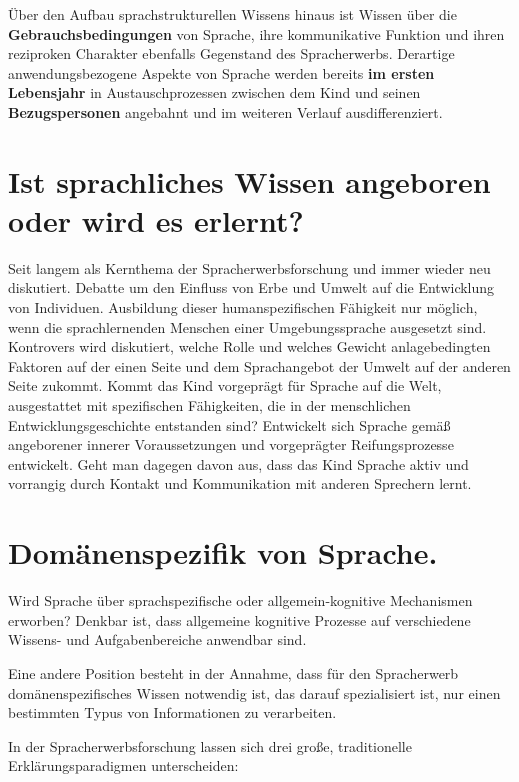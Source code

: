 \documentclass[
  letterpaper,
]{scrbook}
\begin{document}
Über den Aufbau sprachstrukturellen Wissens hinaus ist Wissen über die
\textbf{Gebrauchsbedingungen} von Sprache, ihre kommunikative Funktion
und ihren reziproken Charakter ebenfalls Gegenstand des Spracherwerbs.
Derartige anwendungsbezogene Aspekte von Sprache werden bereits
\textbf{im ersten Lebensjahr} in Austauschprozessen zwischen dem Kind
und seinen \textbf{Bezugspersonen} angebahnt und im weiteren Verlauf
ausdifferenziert.

\hypertarget{ist-sprachliches-wissen-angeboren-oder-wird-es-erlernt}{%
\section{Ist sprachliches Wissen angeboren oder wird es
erlernt?}\label{ist-sprachliches-wissen-angeboren-oder-wird-es-erlernt}}

Seit langem als Kernthema der Spracherwerbsforschung und immer wieder
neu diskutiert. Debatte um den Einfluss von Erbe und Umwelt auf die
Entwicklung von Individuen. Ausbildung dieser humanspezifischen
Fähigkeit nur möglich, wenn die sprachlernenden Menschen einer
Umgebungssprache ausgesetzt sind. Kontrovers wird diskutiert, welche
Rolle und welches Gewicht anlagebedingten Faktoren auf der einen Seite
und dem Sprachangebot der Umwelt auf der anderen Seite zukommt. Kommt
das Kind vorgeprägt für Sprache auf die Welt, ausgestattet mit
spezifischen Fähigkeiten, die in der menschlichen Entwicklungsgeschichte
entstanden sind? Entwickelt sich Sprache gemäß angeborener innerer
Voraussetzungen und vorgeprägter Reifungsprozesse entwickelt. Geht man
dagegen davon aus, dass das Kind Sprache aktiv und vorrangig durch
Kontakt und Kommunikation mit anderen Sprechern lernt.  

\hypertarget{domuxe4nenspezifik-von-sprache.}{%
\section{Domänenspezifik von
Sprache.}\label{domuxe4nenspezifik-von-sprache.}}

Wird Sprache über sprachspezifische oder allgemein-kognitive Mechanismen
erworben? Denkbar ist, dass allgemeine kognitive Prozesse auf
verschiedene Wissens- und Aufgabenbereiche anwendbar sind.

Eine andere Position besteht in der Annahme, dass für den Spracherwerb
domänenspezifisches Wissen notwendig ist, das darauf spezialisiert ist,
nur einen bestimmten Typus von Informationen zu verarbeiten.

In der Spracherwerbsforschung lassen sich drei große, traditionelle
Erklärungsparadigmen unterscheiden:
\end{document}
